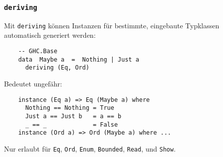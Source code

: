 \documentclass{beamer}
\begin{document}
\begin{frame}[fragile]
  \frametitle{\lstinline{deriving}}
  Mit \lstinline{deriving} können Instanzen für bestimmte, eingebaute Typklassen automatisch generiert werden:
  \begin{lstlisting}
    -- GHC.Base
    data  Maybe a  =  Nothing | Just a
      deriving (Eq, Ord)
  \end{lstlisting}
  Bedeutet ungefähr:
  \begin{lstlisting}
    instance (Eq a) => Eq (Maybe a) where
      Nothing == Nothing = True
      Just a == Just b   = a == b
      _ == _             = False
    instance (Ord a) => Ord (Maybe a) where ...
  \end{lstlisting}
  Nur erlaubt für \lstinline{Eq}, \lstinline{Ord}, \lstinline{Enum}, \lstinline{Bounded}, \lstinline{Read}, und \lstinline{Show}.
\end{frame}
\end{document}

